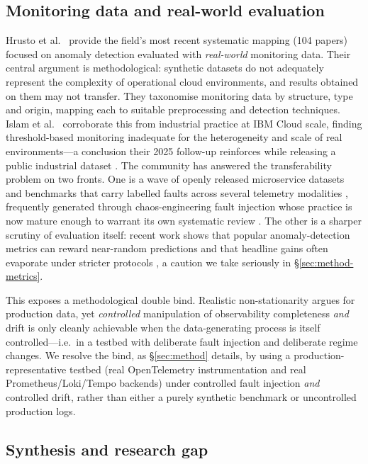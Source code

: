 \documentclass[acmsmall]{acmart}
\begin{document}
\subsection{Monitoring data and real-world evaluation}\label{sec:bg-eval}

Hrusto et al.\ \cite{hrusto2026} provide the field's most recent systematic mapping (104 papers) focused on anomaly detection evaluated with \emph{real-world} monitoring data. Their central argument is methodological: synthetic datasets do not adequately represent the complexity of operational cloud environments, and results obtained on them may not transfer. They taxonomise monitoring data by structure, type and origin, mapping each to suitable preprocessing and detection techniques. Islam et al.\ \cite{islam2021} corroborate this from industrial practice at IBM Cloud scale, finding threshold-based monitoring inadequate for the heterogeneity and scale of real environments---a conclusion their 2025 follow-up reinforces while releasing a public industrial dataset \cite{islam2025cloud}. The community has answered the transferability problem on two fronts. One is a wave of openly released microservice datasets and benchmarks that carry labelled faults across several telemetry modalities \cite{bakhtin2025lo2,pham2025rcaeval,ping2026anomod}, frequently generated through chaos-engineering fault injection whose practice is now mature enough to warrant its own systematic review \cite{owotogbe2026chaos}. The other is a sharper scrutiny of evaluation itself: recent work shows that popular anomaly-detection metrics can reward near-random predictions and that headline gains often evaporate under stricter protocols \cite{sarfraz2024quovadis,wagner2025metrics}, a caution we take seriously in \S\ref{sec:method-metrics}.

This exposes a methodological double bind. Realistic non-stationarity argues for production data, yet \emph{controlled} manipulation of observability completeness \emph{and} drift is only cleanly achievable when the data-generating process is itself controlled---i.e.\ in a testbed with deliberate fault injection and deliberate regime changes. We resolve the bind, as \S\ref{sec:method} details, by using a production-representative testbed (real OpenTelemetry instrumentation and real Prometheus/Loki/Tempo backends) under controlled fault injection \emph{and} controlled drift, rather than either a purely synthetic benchmark or uncontrolled production logs.

\subsection{Synthesis and research gap}\label{sec:bg-gap}
\end{document}
